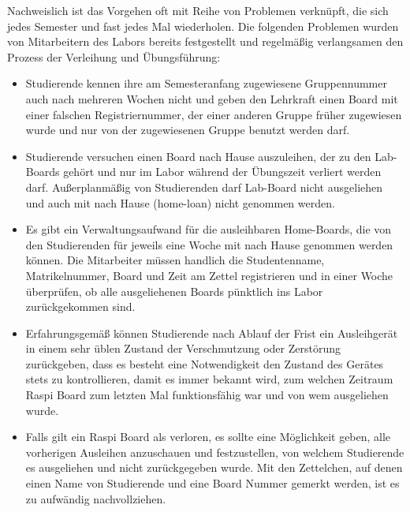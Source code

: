 Nachweislich ist das Vorgehen oft mit Reihe von Problemen verknüpft, die sich jedes Semester und fast jedes Mal wiederholen. Die folgenden Problemen wurden von Mitarbeitern des Labors bereits festgestellt und regelmäßig verlangsamen den Prozess der Verleihung und Übungsführung: 
\begin{itemize}
	\item Studierende kennen ihre am Semesteranfang zugewiesene Gruppennummer auch nach mehreren Wochen nicht und geben den Lehrkraft einen Board mit einer falschen Registriernummer, der einer anderen Gruppe früher zugewiesen wurde und nur von der zugewiesenen Gruppe benutzt werden darf. 
	\item Studierende versuchen  einen Board nach Hause auszuleihen, der zu den Lab-Boards gehört und nur im Labor während der Übungszeit verliert werden darf. Außerplanmäßig von Studierenden darf Lab-Board nicht ausgeliehen und auch mit nach Hause (home-loan) nicht genommen werden.
	\item Es gibt ein Verwaltungsaufwand für die ausleihbaren Home-Boards, die von den Studierenden für jeweils eine Woche mit nach Hause genommen werden können. Die Mitarbeiter müssen handlich die Studentenname, Matrikelnummer, Board und Zeit am Zettel registrieren und in einer Woche überprüfen, ob alle ausgeliehenen Boards pünktlich ins Labor zurückgekommen sind. 
	\item Erfahrungsgemäß können Studierende nach Ablauf der Frist ein Ausleihgerät in einem sehr üblen Zustand der Verschmutzung oder Zerstörung zurückgeben, dass es besteht eine Notwendigkeit den Zustand des Gerätes stets zu kontrollieren, damit es immer bekannt wird, zum welchen Zeitraum Raspi Board zum letzten Mal funktionsfähig war und von wem ausgeliehen wurde.  
	\item Falls gilt ein Raspi Board als verloren, es sollte eine Möglichkeit geben, alle vorherigen Ausleihen anzuschauen und festzustellen, von welchem Studierende es ausgeliehen und nicht zurückgegeben wurde. Mit den Zettelchen, auf denen einen Name von Studierende und eine Board Nummer gemerkt werden, ist es zu aufwändig nachvollziehen.	
\end{itemize}

